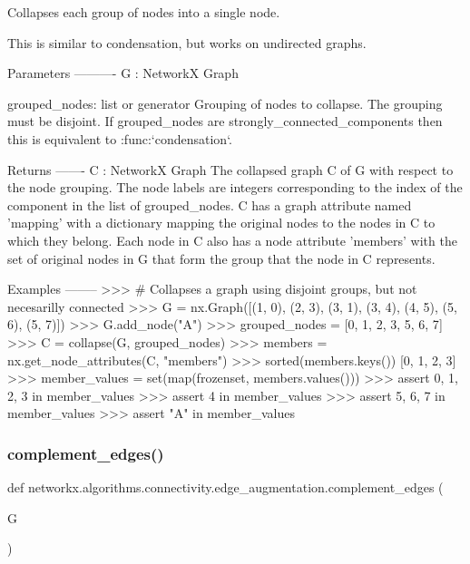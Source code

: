 \begin{DoxyVerb}Collapses each group of nodes into a single node.

This is similar to condensation, but works on undirected graphs.

Parameters
----------
G : NetworkX Graph

grouped_nodes:  list or generator
   Grouping of nodes to collapse. The grouping must be disjoint.
   If grouped_nodes are strongly_connected_components then this is
   equivalent to :func:`condensation`.

Returns
-------
C : NetworkX Graph
   The collapsed graph C of G with respect to the node grouping.  The node
   labels are integers corresponding to the index of the component in the
   list of grouped_nodes.  C has a graph attribute named 'mapping' with a
   dictionary mapping the original nodes to the nodes in C to which they
   belong.  Each node in C also has a node attribute 'members' with the set
   of original nodes in G that form the group that the node in C
   represents.

Examples
--------
>>> # Collapses a graph using disjoint groups, but not necesarilly connected
>>> G = nx.Graph([(1, 0), (2, 3), (3, 1), (3, 4), (4, 5), (5, 6), (5, 7)])
>>> G.add_node("A")
>>> grouped_nodes = [{0, 1, 2, 3}, {5, 6, 7}]
>>> C = collapse(G, grouped_nodes)
>>> members = nx.get_node_attributes(C, "members")
>>> sorted(members.keys())
[0, 1, 2, 3]
>>> member_values = set(map(frozenset, members.values()))
>>> assert {0, 1, 2, 3} in member_values
>>> assert {4} in member_values
>>> assert {5, 6, 7} in member_values
>>> assert {"A"} in member_values
\end{DoxyVerb}
 \mbox{\label{namespacenetworkx_1_1algorithms_1_1connectivity_1_1edge__augmentation_a5d7f5daaa006218e0ba96ca546f1cd78}} 
\subsubsection{\texorpdfstring{complement\+\_\+edges()}{complement\_edges()}}
{\footnotesize\ttfamily def networkx.\+algorithms.\+connectivity.\+edge\+\_\+augmentation.\+complement\+\_\+edges (\begin{DoxyParamCaption}\item[{}]{G }\end{DoxyParamCaption})}

